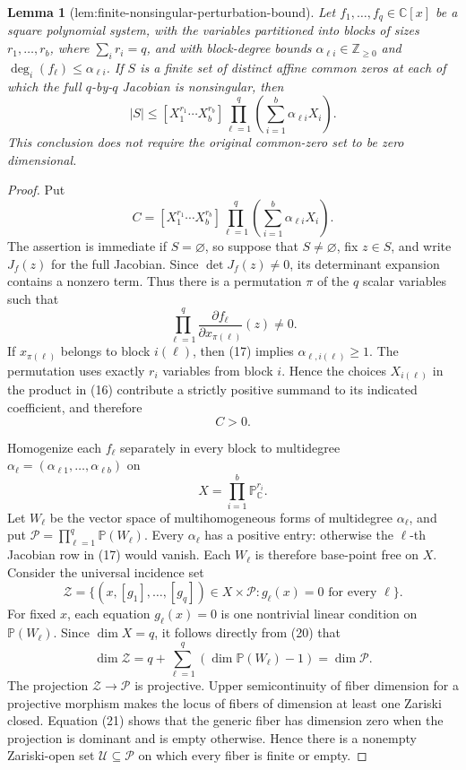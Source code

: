 \documentclass{article}
\newtheorem{lemma}{Lemma}
\begin{document}
\begin{lemma}[lem:finite-nonsingular-perturbation-bound]\label{lem:finite-nonsingular-perturbation-bound}
Let \(f_1,\ldots,f_q\in\mathbb C[x]\) be a square polynomial system, with the variables partitioned into blocks of sizes \(r_1,\ldots,r_b\), where \(\sum_i r_i=q\), and with block-degree bounds \(\alpha_{\ell i}\in\mathbb Z_{\geq0}\) and \(\deg_i(f_\ell)\leq\alpha_{\ell i}\). If \(S\) is a finite set of distinct affine common zeros at each of which the full \(q\)-by-\(q\) Jacobian is nonsingular, then
\[
 |S|\leq
 [X_1^{r_1}\cdots X_b^{r_b}]
 \prod_{\ell=1}^{q}\left(\sum_{i=1}^{b}\alpha_{\ell i}X_i\right).
\]
This conclusion does not require the original common-zero set to be zero dimensional.
\end{lemma}
\begin{proof}
Put
\[
 C=[X_1^{r_1}\cdots X_b^{r_b}]
 \prod_{\ell=1}^{q}\left(\sum_{i=1}^{b}\alpha_{\ell i}X_i\right).
\tag{16}
\]
The assertion is immediate if \(S=\varnothing\), so suppose that \(S\ne\varnothing\), fix \(z\in S\), and write \(J_f(z)\) for the full Jacobian. Since \(\det J_f(z)\ne0\), its determinant expansion contains a nonzero term. Thus there is a permutation \(\pi\) of the \(q\) scalar variables such that
\[
 \prod_{\ell=1}^{q}
 \frac{\partial f_\ell}{\partial x_{\pi(\ell)}}(z)\ne0.
\tag{17}
\]
If \(x_{\pi(\ell)}\) belongs to block \(i(\ell)\), then (17) implies \(\alpha_{\ell,i(\ell)}\geq1\). The permutation uses exactly \(r_i\) variables from block \(i\). Hence the choices \(X_{i(\ell)}\) in the product in (16) contribute a strictly positive summand to its indicated coefficient, and therefore
\[
 C>0.
\tag{18}
\]

Homogenize each \(f_\ell\) separately in every block to multidegree \(\alpha_\ell=(\alpha_{\ell1},\ldots,\alpha_{\ell b})\) on
\[
 X=\prod_{i=1}^{b}\mathbb P^{r_i}_{\mathbb C}.
\tag{19}
\]
Let \(W_\ell\) be the vector space of multihomogeneous forms of multidegree \(\alpha_\ell\), and put \(\mathcal P=\prod_{\ell=1}^{q}\mathbb P(W_\ell)\). Every \(\alpha_\ell\) has a positive entry: otherwise the \(\ell\)-th Jacobian row in (17) would vanish. Each \(W_\ell\) is therefore base-point free on \(X\). Consider the universal incidence set
\[
 \mathcal Z=
 \{(x,[g_1],\ldots,[g_q])\in X\times\mathcal P:
       g_\ell(x)=0\text{ for every }\ell\}.
\tag{20}
\]
For fixed \(x\), each equation \(g_\ell(x)=0\) is one nontrivial linear condition on \(\mathbb P(W_\ell)\). Since \(\dim X=q\), it follows directly from (20) that
\[
 \dim\mathcal Z
 =q+\sum_{\ell=1}^{q}(\dim\mathbb P(W_\ell)-1)
 =\dim\mathcal P.
\tag{21}
\]
The projection \(\mathcal Z\to\mathcal P\) is projective. Upper semicontinuity of fiber dimension for a projective morphism makes the locus of fibers of dimension at least one Zariski closed. Equation (21) shows that the generic fiber has dimension zero when the projection is dominant and is empty otherwise. Hence there is a nonempty Zariski-open set \(\mathcal U\subseteq\mathcal P\) on which every fiber is finite or empty.


\end{proof}
\end{document}
